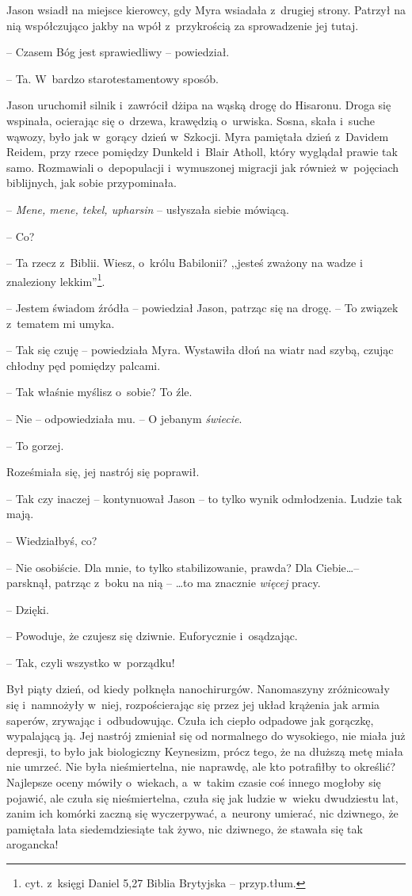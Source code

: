 \documentclass[oneside,polish,11pt,sfheadings]{mwbk}
\begin{document}
Jason wsiadł na miejsce kierowcy, gdy Myra wsiadała z~drugiej strony.
Patrzył na nią współczująco jakby na wpół z~przykrością za sprowadzenie
jej tutaj.

-- Czasem Bóg jest sprawiedliwy -- powiedział.

-- Ta. W~bardzo starotestamentowy sposób.

Jason uruchomił silnik i~zawrócił dżipa na wąską drogę do Hisaronu.
Droga się wspinała, ocierając się o~drzewa, krawędzią o~urwiska. Sosna,
skała i~suche wąwozy, było jak w~gorący dzień w~Szkocji. Myra pamiętała
dzień z~Davidem Reidem, przy rzece pomiędzy Dunkeld i~Blair Atholl,
który wyglądał prawie tak samo. Rozmawiali o~depopulacji i~wymuszonej
migracji jak również w~pojęciach biblijnych, jak sobie przypominała.

-- \textit{Mene, mene, tekel, upharsin} -- usłyszała siebie mówiącą.

-- Co?

-- Ta rzecz z~Biblii. Wiesz, o~królu Babilonii? ,,jesteś zważony na wadze
i znaleziony lekkim''\footnote{ cyt. z~księgi Daniel 5,27 Biblia Brytyjska -- przyp.tłum.}.

-- Jestem świadom źródła -- powiedział Jason, patrząc się na drogę. -- To
związek z~tematem mi umyka.

-- Tak się czuję -- powiedziała Myra. Wystawiła dłoń na wiatr nad szybą,
czując chłodny pęd pomiędzy palcami.

-- Tak właśnie myślisz o~sobie? To źle.

-- Nie -- odpowiedziała mu. -- O jebanym \textit{świecie}.

-- To gorzej.

Roześmiała się, jej nastrój się poprawił.

-- Tak czy inaczej -- kontynuował Jason -- to tylko wynik odmłodzenia.
Ludzie tak mają.

-- Wiedziałbyś, co?

-- Nie osobiście. Dla mnie, to tylko stabilizowanie, prawda? Dla
Ciebie\ldots -- parsknął, patrząc z~boku na nią -- \ldots to ma znacznie
\textit{więcej} pracy.

-- Dzięki.

-- Powoduje, że czujesz się dziwnie. Euforycznie i~osądzając.

-- Tak, czyli wszystko w~porządku!

Był piąty dzień, od kiedy połknęła nanochirurgów. Nanomaszyny zróżnicowały
się i~namnożyły w~niej, rozpościerając się przez jej układ krążenia jak
armia saperów, zrywając i~odbudowując. Czuła ich ciepło odpadowe jak
gorączkę, wypalającą ją. Jej nastrój zmieniał się od normalnego do
wysokiego, nie miała już depresji, to było jak biologiczny Keynesizm,
prócz tego, że na dłuższą metę miała nie umrzeć. Nie była nieśmiertelna,
nie naprawdę, ale kto potrafiłby to określić? Najlepsze oceny mówiły o~wiekach, a~w~takim czasie coś innego mogłoby się pojawić, ale czuła się
nieśmiertelna, czuła się jak ludzie w~wieku dwudziestu lat, zanim ich
komórki zaczną się wyczerpywać, a~neurony umierać, nic dziwnego, że
pamiętała lata siedemdziesiąte tak żywo, nic dziwnego, że stawała się
tak arogancka!
\end{document}
